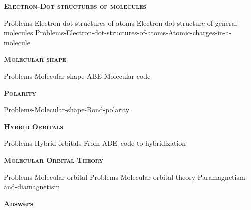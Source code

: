 \documentclass[main.tex]{subfiles}
\begin{document}
\newpage
\setdoublesep{0.35700 em}  %
\setatomsep{1.78500 em}    %
\setbondoffset{0.18265 em} %
\newcommand{\bondwidth}{0.06642 em} %
\setbondstyle{line width = \bondwidth}
\fancyhfoffset[E,O]{0pt}
\setlength{\columnsep}{30pt}
\begin{conclusion}
\end{conclusion}






\begin{multicols*}{2}\setcounter{numA}{1}  

{\raggedright\textsc{\textbf{Electron-Dot structures of molecules }}\par}
{Problems-Electron-dot-structures-of-atoms-Electron-dot-structure-of-general-molecules}
{Problems-Electron-dot-structures-of-atoms-Atomic-charges-in-a-molecule}
{\raggedright\textsc{\textbf{Molecular shape}}\par}
{Problems-Molecular-shape-ABE-Molecular-code}


{\raggedright\textsc{\textbf{Polarity}}\par}
{Problems-Molecular-shape-Bond-polarity}
{\raggedright\textsc{\textbf{Hybrid Orbitals}}\par}
{Problems-Hybrid-orbitals-From-ABE--code-to-hybridization}
{\raggedright\textsc{\textbf{Molecular Orbital Theory}}\par}
{Problems-Molecular-orbital}
{Problems-Molecular-orbital-theory-Paramagnetism-and-diamagnetism}


 
\end{multicols*}
\newpage
\begin{answersenvironment}
\begin{minipage}[c]{1\textwidth}
\begin{localsize}{10}
{\Large \bf Answers}
\printsolutions 
\end{localsize}
\end{minipage}\end{answersenvironment}
\end{document}

